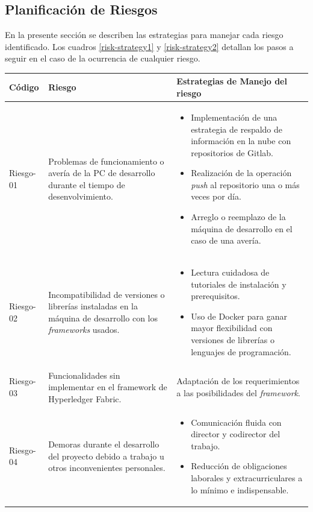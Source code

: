\subsection{Planificación de Riesgos}
En la presente sección se describen las estrategias para manejar cada riesgo identificado. Los cuadros \ref{risk-strategy1} y \ref{risk-strategy2} detallan los pasos a seguir en el caso de la ocurrencia de cualquier riesgo.
\begin{table}[h]
    \begin{tabular}{|C{2cm}|m{3.5cm}|C{8cm}|}
    \hline
    \textbf{Código} & \textbf{Riesgo} & \textbf{Estrategias de Manejo del riesgo}\\
    \hline
    Riesgo-01 & Problemas de funcionamiento o avería de la PC de desarrollo durante el tiempo de desenvolvimiento. & \begin{itemize}
        \item Implementación de una estrategia de respaldo de información en la nube con repositorios de Gitlab.
        \item Realización de la operación \textit{push} al repositorio una o más veces por día.
        \item Arreglo o reemplazo de la máquina de desarrollo en el caso de una avería.
    \end{itemize}\\
    \hline
    Riesgo-02 & Incompatibilidad de versiones o librerías instaladas en la máquina de desarrollo con los \textit{frameworks}  usados. & \begin{itemize}
        \item Lectura cuidadosa de tutoriales de instalación y prerequisitos.
        \item Uso de Docker para ganar mayor flexibilidad con versiones de librerías o lenguajes de programación.
    \end{itemize}\\
    \hline
    Riesgo-03 & Funcionalidades sin implementar en el framework de Hyperledger Fabric. & Adaptación de los requerimientos a las posibilidades del \textit{framework}.\\
    \hline
    Riesgo-04 & Demoras durante el desarrollo del proyecto debido a trabajo u otros inconvenientes personales. & \begin{itemize}
        \item Comunicación fluida con director y codirector del trabajo.
        \item Reducción de obligaciones laborales y extracurriculares a lo mínimo e indispensable.

\end{itemize}
\end{tabular}
\end{table}

